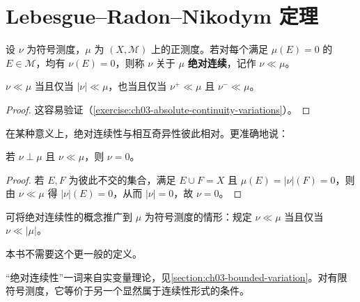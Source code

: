 \documentclass[../../main.tex]{subfiles}%
\begin{document}
\section{Lebesgue–Radon–Nikodym 定理}\label{section:ch03-lebesgue-radon-nikodym}
\begin{definition}[绝对连续]\label{definition:ch03-absolute-continuity}
设 $\nu$ 为符号测度，$\mu$ 为 $(X,\mathscr{M})$ 上的正测度。若对每个满足 $\mu(E)=0$ 的 $E\in\mathscr{M}$，均有 $\nu(E)=0$，则称 $\nu$ 关于 $\mu$ \textbf{绝对连续}，记作 $\nu\ll\mu$。
\end{definition}
\begin{proposition}\label{proposition:ch03-absolute-continuity-variations}
$\nu\ll\mu$ 当且仅当 $|\nu|\ll\mu$，也当且仅当 $\nu^+\ll\mu$ 且 $\nu^-\ll\mu$。
\end{proposition}
\begin{proof}
这容易验证（\cref{exercise:ch03-absolute-continuity-variations}）。
\end{proof}
在某种意义上，绝对连续性与相互奇异性彼此相对。更准确地说：
\begin{proposition}\label{proposition:ch03-singular-absolute-continuity-zero}
若 $\nu\perp\mu$ 且 $\nu\ll\mu$，则 $\nu=0$。
\end{proposition}
\begin{proof}
若 $E,F$ 为彼此不交的集合，满足 $E\cup F=X$ 且 $\mu(E)=|\nu|(F)=0$，则由 $\nu\ll\mu$ 得 $|\nu|(E)=0$，从而 $|\nu|=0$，故 $\nu=0$。
\end{proof}
\begin{definition}[关于符号测度的绝对连续性]\label{definition:ch03-absolute-continuity-signed-extension}
可将绝对连续性的概念推广到 $\mu$ 为符号测度的情形：规定 $\nu\ll\mu$ 当且仅当 $\nu\ll|\mu|$。
\end{definition}
\begin{remark}
本书不需要这个更一般的定义。
\end{remark}
“绝对连续性”一词来自实变量理论，见\cref{section:ch03-bounded-variation}。对有限符号测度，它等价于另一个显然属于连续性形式的条件。
\end{document}
